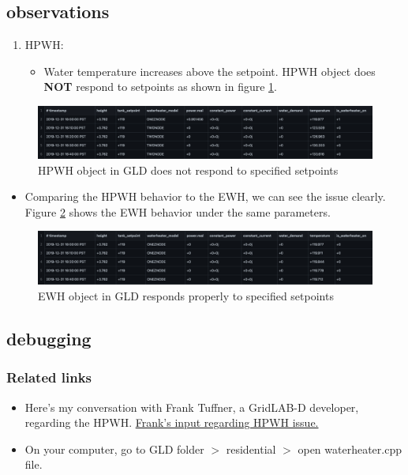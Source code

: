 \subsection{observations}
    \begin{enumerate}
        \item HP\textunderscore WH:
        \begin{itemize}
            \item Water temperature increases above the setpoint. HP\textunderscore WH object does \textbf{NOT} respond to setpoints as shown in figure \ref{fig:HPWH}.
    \end{itemize}
    \end{enumerate}
    \begin{figure}[htp!]
        \centering
        \includegraphics[width=1.1\columnwidth]{Pictures/HPWH_wrong_behavior.png}
        \caption{HPWH object in GLD does not respond to specified setpoints}
        \label{fig:HPWH}
    \end{figure}
    \begin{itemize}
        \item Comparing the HPWH behavior to the EWH, we can see the issue clearly. Figure \ref{fig:EWH} shows the EWH behavior under the same parameters.
    \end{itemize}
    \begin{figure}[htp!]
        \centering
        \includegraphics[width=1.1\columnwidth]{Pictures/EWH.png}
        \caption{EWH object in GLD responds properly to specified setpoints}
        \label{fig:EWH}
    \end{figure}
\newpage
    
\subsection{debugging}
\subsubsection{Related links}
\begin{itemize}
    \item Here's my conversation with Frank Tuffner, a GridLAB-D developer, regarding the HPWH. \href{https://sourceforge.net/p/gridlab-d/discussion/842562/thread/4a543d83a0/?limit=25#71e9}{Frank's input regarding HPWH issue.}
    \item On your computer, go to GLD folder $>$ residential $>$ open waterheater.cpp file.
\end{itemize}
